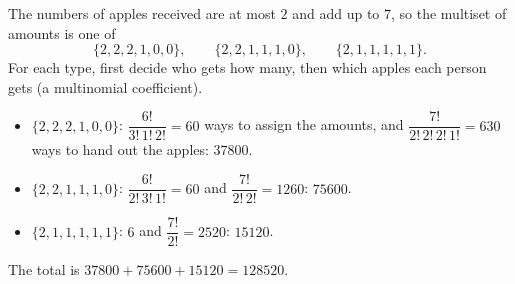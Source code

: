 The numbers of apples received are at most $2$ and add up to $7$, so the multiset of amounts is one of
\[\{2,2,2,1,0,0\},\qquad\{2,2,1,1,1,0\},\qquad\{2,1,1,1,1,1\}.\]
For each type, first decide who gets how many, then which apples each person gets (a multinomial coefficient).
\begin{itemize}
\item $\{2,2,2,1,0,0\}$: $\dfrac{6!}{3!\,1!\,2!}=60$ ways to assign the amounts, and $\dfrac{7!}{2!\,2!\,2!\,1!}=630$ ways to hand out the apples: $37800$.
\item $\{2,2,1,1,1,0\}$: $\dfrac{6!}{2!\,3!\,1!}=60$ and $\dfrac{7!}{2!\,2!}=1260$: $75600$.
\item $\{2,1,1,1,1,1\}$: $6$ and $\dfrac{7!}{2!}=2520$: $15120$.
\end{itemize}
The total is $37800+75600+15120=\boxed{128520}$.
